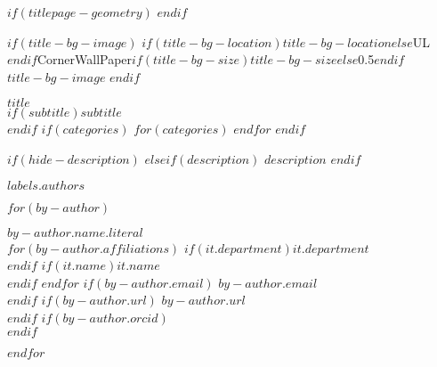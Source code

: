 
$if(titlepage-geometry)$
$endif$
\begin{minipage}[b][\textheight][s]{\textwidth}
\raggedright

$if(title-bg-image)$
\This$if(title-bg-location)$$title-bg-location$$else$UL$endif$CornerWallPaper{$if(title-bg-size)$$title-bg-size$$else$0.5$endif$}{$title-bg-image$}
$endif$

{\Huge\bfseries{$title$}}\\[1\baselineskip]
$if(subtitle)${\LARGE{$subtitle$}}\\[1\baselineskip]$endif$
$if(categories)$
  $for(categories)$
  $endfor$
\vspace{3mm}
$endif$

$if(hide-description)$
$elseif(description)$
    $description$
$endif$

\begin{titlepagebox}



\textcolor{anugold}{\MakeUppercase{$labels.authors$}}
\vspace{-3mm}
\begin{multicols}{2}
$for(by-author)$
    \begin{minipage}{\columnwidth}
    \raggedright
    \normalfont
    {\textbf{$by-author.name.literal$}}\\
    $for(by-author.affiliations)$
    $if(it.department)${$it.department$}\\$endif$
    $if(it.name)${\itshape{$it.name$}}\\$endif$
    $endfor$
    $if(by-author.email)$ $by-author.email$\\$endif$
    $if(by-author.url)$ $by-author.url$\\$endif$
    $if(by-author.orcid)$\\$endif$
    \vspace{4mm}
    \end{minipage}

$endfor$
\end{multicols}

\vspace{-4mm}


\end{titlepagebox}
\end{minipage}
